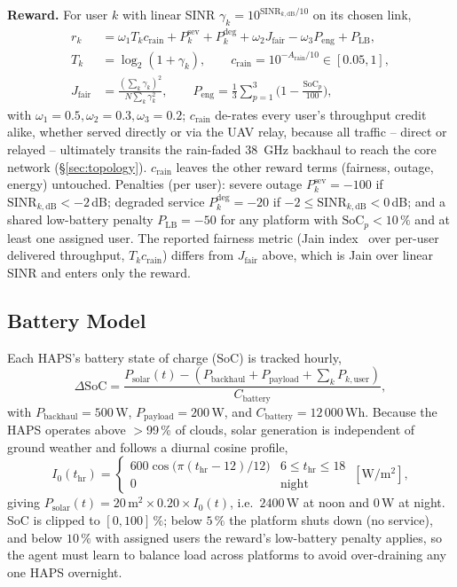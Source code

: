 \documentclass[]{ieeeaccess}
\begin{document}
\textbf{Reward.} For user $k$ with linear SINR $\gamma_k=10^{\mathrm{SINR}_{k,\mathrm{dB}}/10}$ on its chosen link,
\begin{align}
r_k &= \omega_1 T_k c_\mathrm{rain} + P^\mathrm{sev}_k + P^\mathrm{deg}_k + \omega_2 J_\mathrm{fair} - \omega_3 P_\mathrm{eng} + P_\mathrm{LB},\nonumber\\
T_k &= \log_2(1+\gamma_k), \qquad c_\mathrm{rain}=10^{-A_\mathrm{rain}/10}\in[0.05,1],\nonumber\\
J_\mathrm{fair} &= \frac{(\sum_k\gamma_k)^2}{N\sum_k\gamma_k^2}, \qquad P_\mathrm{eng}=\frac{1}{3}\sum_{p=1}^3\Big(1-\frac{\mathrm{SoC}_p}{100}\Big),
\label{eq:reward}
\end{align}
with $\omega_1=0.5,\omega_2=0.3,\omega_3=0.2$; $c_\mathrm{rain}$ de-rates every user's throughput credit alike, whether served directly or via the UAV relay, because all traffic -- direct or relayed -- ultimately transits the rain-faded 38~GHz backhaul to reach the core network (\S\ref{sec:topology}). $c_\mathrm{rain}$ leaves the other reward terms (fairness, outage, energy) untouched. Penalties (per user): severe outage $P^\mathrm{sev}_k=-100$ if $\mathrm{SINR}_{k,\mathrm{dB}}<-2$\,dB; degraded service $P^\mathrm{deg}_k=-20$ if $-2\le\mathrm{SINR}_{k,\mathrm{dB}}<0$\,dB; and a shared low-battery penalty $P_\mathrm{LB}=-50$ for any platform with $\mathrm{SoC}_p<10\,\%$ and at least one assigned user. The reported fairness metric (Jain index~\cite{jain1984quantitative} over per-user delivered throughput, $T_kc_\mathrm{rain}$) differs from $J_\mathrm{fair}$ above, which is Jain over linear SINR and enters only the reward.

\subsection{Battery Model}
\label{subsec:battery}

Each HAPS's battery state of charge (SoC) is tracked hourly,
\begin{equation}
\Delta\mathrm{SoC} = \frac{P_\mathrm{solar}(t) - (P_\mathrm{backhaul}+P_\mathrm{payload}+\sum_k P_{k,\mathrm{user}})}{C_\mathrm{battery}},
\label{eq:battery-balance}
\end{equation}
with $P_\mathrm{backhaul}=500$\,W, $P_\mathrm{payload}=200$\,W, and $C_\mathrm{battery}=12\,000$\,Wh. Because the HAPS operates above $>$99\,\% of clouds, solar generation is independent of ground weather and follows a diurnal cosine profile,
\begin{equation}
I_0(t_\mathrm{hr}) = \begin{cases} 600\cos\!\big(\pi(t_\mathrm{hr}-12)/12\big) & 6\le t_\mathrm{hr}\le 18\\ 0 & \text{night}\end{cases}\ [\mathrm{W/m^2}],
\end{equation}
giving $P_\mathrm{solar}(t)=20\,\mathrm{m}^2\times0.20\times I_0(t)$, i.e.\ $2400$\,W at noon and $0$\,W at night. SoC is clipped to $[0,100]\,\%$; below $5\,\%$ the platform shuts down (no service), and below $10\,\%$ with assigned users the reward's low-battery penalty applies, so the agent must learn to balance load across platforms to avoid over-draining any one HAPS overnight.
\end{document}
